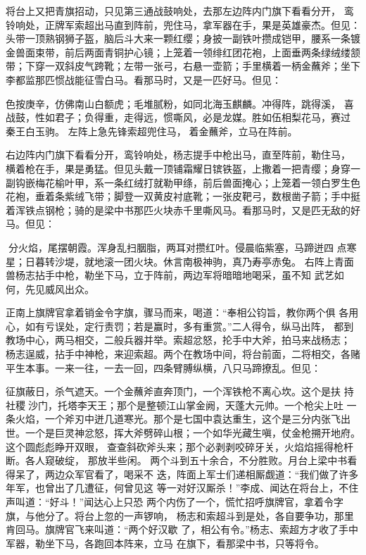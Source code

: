 将台上又把青旗招动，只见第三通战鼓响处，去那左边阵内门旗下看看分开，
鸾铃响处，正牌军索超出马直到阵前，兜住马，拿军器在手，果是英雄豪杰。但见：
头带一顶熟钢狮子盔，脑后斗大来一颗红缨；身披一副铁叶攒成铠甲，腰系一条镀
金兽面束带，前后两面青铜护心镜；上笼着一领绯红团花袍，上面垂两条绿绒缕颔
带；下穿一双斜皮气跨靴；左带一张弓，右悬一壶箭；手里横着一柄金蘸斧；坐下
李都监那匹惯战能征雪白马。看那马时，又是一匹好马。但见：

色按庚辛，仿佛南山白额虎；毛堆腻粉，如同北海玉麒麟。冲得阵，跳得溪，
喜战鼓，性如君子；负得重，走得远，惯嘶风，必是龙媒。胜如伍相梨花马，赛过
秦王白玉驹。
左阵上急先锋索超兜住马，着金蘸斧，立马在阵前。

右边阵内门旗下看看分开，鸾铃响处，杨志提手中枪出马，直至阵前，勒住马，
横着枪在手，果是勇猛。但见头戴一顶铺霜耀日镔铁盔，上撒着一把青缨；身穿一
副钩嵌梅花榆叶甲，系一条红绒打就勒甲绦，前后兽面掩心；上笼着一领白罗生色
花袍，垂着条紫绒飞带；脚登一双黄皮衬底靴；一张皮靶弓，数根凿子箭；手中挺
着浑铁点钢枪；骑的是梁中书那匹火块赤千里嘶风马。看那马时，又是匹无敌的好
马。但见：

分火焰，尾摆朝霞。浑身乱扫胭脂，两耳对攒红叶。侵晨临紫塞，马蹄迸四
点寒星；日暮转沙堤，就地滚一团火块。休言南极神驹，真乃寿亭赤兔。
右阵上青面兽杨志拈手中枪，勒坐下马，立于阵前，两边军将暗暗地喝采，虽不知
武艺如何，先见威风出众。

正南上旗牌官拿着销金令字旗，骤马而来，喝道：“奉相公钧旨，教你两个俱
各用心，如有亏误处，定行责罚；若是赢时，多有重赏。”二人得令，纵马出阵，
都到教场中心，两马相交，二般兵器并举。索超忿怒，抡手中大斧，拍马来战杨志；
杨志逞威，拈手中神枪，来迎索超。两个在教场中间，将台前面，二将相交，各赌
平生本事。一来一往，一去一回，四条臂膊纵横，八只马蹄撩乱。但见：

征旗蔽日，杀气遮天。一个金蘸斧直奔顶门，一个浑铁枪不离心坎。这个是扶
持社稷沙门，托塔李天王；那个是整顿江山掌金阙，天蓬大元帅。一个枪尖上吐
一条火焰，一个斧刃中迸几道寒光。那个是七国中袁达重生，这个是三分内张飞出
世。一个是巨灵神忿怒，挥大斧劈碎山根；一个如华光藏生嗔，仗金枪搠开地府。
这个圆彪彪睁开双眼，查查斜砍斧头来；那个必剥剥咬碎牙关，火焰焰摇得枪杆
断。各人窥破绽，
那放半些闲。
两个斗到五十余合，不分胜败。月台上梁中书看得呆了，两边众军官看了，喝采不
迭，阵面上军士们递相厮觑道：“我们做了许多年军，也曾出了几遭征，何曾见这
等一对好汉厮杀！”李成、闻达在将台上，不住声叫道：“好斗！”闻达心上只恐
两个内伤了一个，慌忙招呼旗牌官，拿着令字旗，与他分了。将台上忽的一声锣响，
杨志和索超斗到是处，各自要争功，那里肯回马。旗牌官飞来叫道：“两个好汉歇
了，相公有令。”杨志、索超方才收了手中军器，勒坐下马，各跑回本阵来，立马
在旗下，看那梁中书，只等将令。

